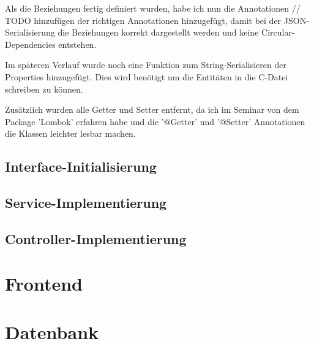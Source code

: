 Als die Beziehungen fertig definiert wurden, habe ich nun die Annotationen // TODO hinzufügen der richtigen Annotationen hinzugefügt, damit bei 
der JSON-Serialisierung die Beziehungen korrekt dargestellt werden und keine Circular-Dependencies entstehen.

Im späteren Verlauf wurde noch eine Funktion zum String-Serialisieren der Properties hinzugefügt. Dies wird benötigt um die Entitäten in die C-Datei schreiben zu können.

Zusätzlich wurden alle Getter und Setter entfernt, da ich im Seminar von dem Package 'Lombok' erfahren habe und die '@Getter' und '@Setter' Annotationen die Klassen leichter lesbar machen.
\subsection{Interface-Initialisierung}
\subsection{Service-Implementierung}
\subsection{Controller-Implementierung}
\section{Frontend}
\section{Datenbank}
\
